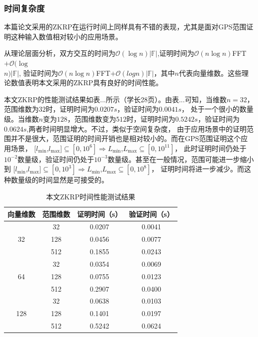\documentclass[zihao=-4]{ctexart}
\begin{document}
\subsubsection{时间复杂度}
本篇论文采用的ZKRP在运行时间上同样具有不错的表现，尤其是面对GPS范围证明这种输入数值相对较小的应用场景。\par
从理论层面分析，双方交互的时间为$\mathcal{O}(\log n)|\mathbb{F}|$,证明时间为$\mathcal{O}(n\log n)$FFT$+\mathcal{O}(\log$\\$ n)|\mathbb{F}|$,
验证时间为$\mathcal{O}(n\log n)$FFT$+\mathcal{O}(logn)|\mathbb{F}|$，其中$n$代表向量维数。这些理论数值表明本文采用的ZKRP具有良好的时间性能。\par
本文ZKRP的性能测试结果如表...所示（学长28页）。由表...可知，当维数$n=32$，范围维数为$32$时，证明时间为$0.0207s$，验证时间为$0.0041s$，
处于一个很小的数量级。当维数$n$变为$128$，范围维数变为$512$时，证明时间为$0.5242s$，验证时间为$0.0624s$,两者时间明显增大。不过，类似于空间复杂度，
由于应用场景中的证明范围并不是很大，范围证明的时间开销也是相对较小的。而在GPS范围证明这个应用场景，
$[l_{\min}$,$l_{\max}]\subseteq[0, 10^6]\Rightarrow L_{\min}$,$L_{\max}\subseteq[0, 10^{11}]$，
此时证明时间仍处于$10^{-2}$数量级，验证时间仍处于$10^{-3}$数量级。甚至在一般情况，范围可能进一步缩小到
$[l_{\min}$,$l_{\max}]\subseteq[0, 10^3]\Rightarrow L_{\min}$,$L_{\max}\subseteq[0, 10^8]$，
证明时间将进一步减少。而这种数量级的时间显然是可接受的。
\begin{table}[!h] %
    \centering
    \caption{本文ZKRP时间性能测试结果}
    \begin{tabular}{|c|c|c|c|}\hline
        向量维数 &  范围维数 & 证明时间（s） & 验证时间（s）\\ \hline
         \multirow{3}{*}{32} & 32 & 0.0207 & 0.0041 \\ \cline{2-4}
         \multirow{3}{*}{} & 128 & 0.0456 & 0.0077 \\  \cline{2-4}
         \multirow{3}{*}{} & 512 & 0.1855 & 0.0243\\ \hline
         \multirow{3}{*}{64} & 32 & 0.0354 & 0.0069 \\ \cline{2-4}
         \multirow{3}{*}{} & 128 & 0.0755 & 0.0123 \\  \cline{2-4}
         \multirow{3}{*}{} & 512 & 0.2907 & 0.0400 \\ \hline
         \multirow{3}{*}{128} & 32 & 0.0638 & 0.0103 \\ \cline{2-4}
         \multirow{3}{*}{} & 128 & 0.1401 & 0.0197 \\  \cline{2-4}
         \multirow{3}{*}{} & 512 & 0.5242 & 0.0624 \\ \hline
    \end{tabular}
    \label{tab:my_label}
\end{table}
\end{document}
